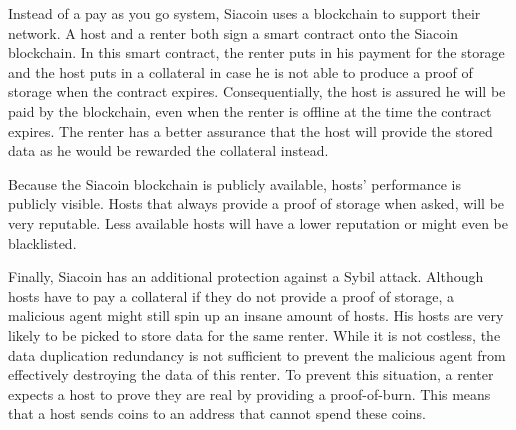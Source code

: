 \fi

Instead of a pay as you go system, Siacoin uses a blockchain to support their network. A host and a renter both sign a smart contract onto the Siacoin blockchain. In this smart contract, the renter puts in his payment for the storage and the host puts in a collateral in case he is not able to produce a proof of storage when the contract expires. Consequentially, the host is assured he will be paid by the blockchain, even when the renter is offline at the time the contract expires. The renter has a better assurance that the host will provide the stored data as he would be rewarded the collateral instead.

Because the Siacoin blockchain is publicly available, hosts' performance is publicly visible. Hosts that always provide a proof of storage when asked, will be very reputable. Less available hosts will have a lower reputation or might even be blacklisted.

Finally, Siacoin has an additional protection against a Sybil attack. Although hosts have to pay a collateral if they do not provide a proof of storage, a malicious agent might still spin up an insane amount of hosts. His hosts are very likely to be picked to store data for the same renter. While it is not costless, the data duplication redundancy is not sufficient to prevent the malicious agent from effectively destroying the data of this renter. To prevent this situation, a renter expects a host to prove they are real by providing a proof-of-burn. This means that a host sends coins to an address that cannot spend these coins. \cite{siacoin}